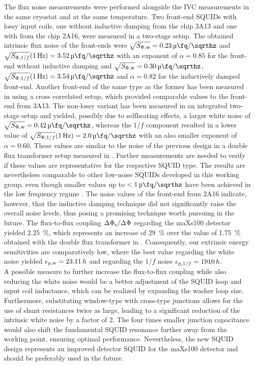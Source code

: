 The flux noise measurements were performed alongside the IVC measurements in the same cryostat and at the same temperature. Two front-end SQUIDs with lossy input coils, one without inductive damping from the chip 3A13 and one with from the chip 2A16, were measured in a two-stage setup. The obtained intrinsic flux noise of the front-ends were  $\sqrt{S_{\rm \Phi,w}}=\qty{0.23}{\micro\fq\per\sqrthz}$ and $\sqrt{S_{{\rm \Phi},1/f}}(\qty{1}{\Hz})=\qty{3.52}{\micro\fq\per\sqrthz}$ with an exponent of $\alpha=0.85$ for the front-end without inductive damping and $\sqrt{S_{\rm \Phi,w}}=\qty{0.30}{\micro\fq\per\sqrthz}$, $\sqrt{S_{{\rm \Phi},1/f}}(\qty{1}{\Hz})=\qty{3.54}{\micro\fq\per\sqrthz}$ and $\alpha=0.82$ for the inductively damped front-end. Another front-end of the same type as the former has been measured in \cite{Mazibrada2024} using a cross correlated setup, which provided comparable values to the front-end from 3A13. The non-lossy variant has been measured in an integrated two-stage setup and yielded, possibly due to selfheating effects, a larger white noise of $\sqrt{S_{\rm \Phi,w}}=\qty{0.42}{\micro\fq\per\sqrthz}$, whereas the $1/f$ component resulted in a lower value of $\sqrt{S_{{\rm \Phi},1/f}}(\qty{1}{\Hz})=\qty{2.0}{\micro\fq\per\sqrthz}$ with an also smaller exponent of $\alpha=0.60$. These values are similar to the noise of the previous design in a double flux transformer setup measured in \cite{Bauer2022}. Further measurements are needed to verify if these values are representative for the respective SQUID type. The results are nevertheless comparable to other low-noise SQUIDs developed in this working group, even though smaller values up to $<\qty{1}{\micro\fq\per\sqrthz}$ have been achieved in the low frequency regime \cite{Ferring2015}. The noise values of the front-end from 2A16 indicate, however, that the inductive damping technique did not significantly raise the overall noise levels, thus posing a promising technique worth pursuing in the future. The flux-to-flux coupling $\Delta\Phi_{\rm s}/\Delta\Phi$ regarding the maXs100 detector yielded \qty{2.25}{\percent}, which represents an increase of \qty{29}{\percent} over the value of \qty{1.75}{\percent} obtained with the double flux transformer in \cite{Bauer2022}. Consequently, our extrinsic energy sensitivities are comparatively low, where the best value regarding the white noise yielded $\epsilon_{\rm p,w}=23.11\, h$ and regarding the $1/f$ noise $\epsilon_{{\rm p}, 1/f}=1910\, h$. \\

A possible measure to further increase the flux-to-flux coupling while also reducing the white noise would be a better adjustment of the SQUID loop and input coil inductance, which can be realized by expanding the washer loop size. Furthermore, substituting window-type with cross-type junctions allows for the use of shunt resistances twice as large, leading to a significant reduction of the intrinsic white noise by a factor of 2. The four times smaller junction capacitance would also shift the fundamental SQUID resonance further away from the working point, ensuring optimal performance. Nevertheless, the new SQUID design represents an improved detector SQUID for the maXs100 detector and should be preferably used in the future. 
